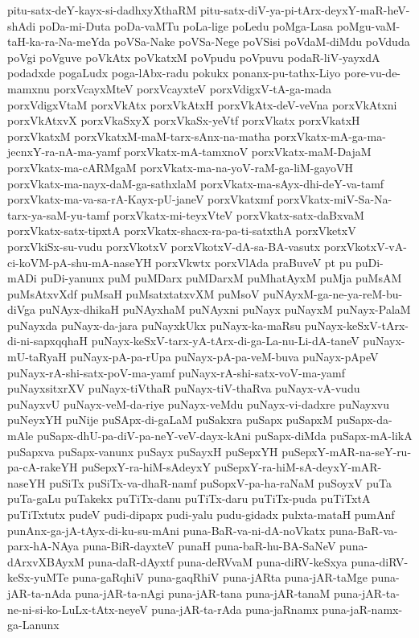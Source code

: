 {pitu-satx-deY-kayx-si-dadhxyXthaRM
pitu-satx-diV-ya-pi-tArx-deyxY-maR-heV-shAdi
poDa-mi-Duta
poDa-vaMTu
poLa-lige
poLedu
poMga-Lasa
poMgu-vaM-taH-ka-ra-Na-meYda
poVSa-Nake
poVSa-Nege
poVSisi
poVdaM-diMdu
poVduda
poVgi
poVguve
poVkAtx
poVkatxM
poVpudu
poVpuvu
podaR-liV-yayxdA
podadxde
pogaLudx
poga-lAbx-radu
pokukx
ponanx-pu-tathx-Liyo
pore-vu-de-mamxnu
porxVcayxMteV
porxVcayxteV
porxVdigxV-tA-ga-mada
porxVdigxVtaM
porxVkAtx
porxVkAtxH
porxVkAtx-deV-veVna
porxVkAtxni
porxVkAtxvX
porxVkaSxyX
porxVkaSx-yeVtf
porxVkatx
porxVkatxH
porxVkatxM
porxVkatxM-maM-tarx-sAnx-na-matha
porxVkatx-mA-ga-ma-jecnxY-ra-nA-ma-yamf
porxVkatx-mA-tamxnoV
porxVkatx-maM-DajaM
porxVkatx-ma-cARMgaM
porxVkatx-ma-na-yoV-raM-ga-liM-gayoVH
porxVkatx-ma-nayx-daM-ga-sathxlaM
porxVkatx-ma-sAyx-dhi-deY-va-tamf
porxVkatx-ma-va-sa-rA-Kayx-pU-janeV
porxVkatxmf
porxVkatx-miV-Sa-Na-tarx-ya-saM-yu-tamf
porxVkatx-mi-teyxVteV
porxVkatx-satx-daBxvaM
porxVkatx-satx-tipxtA
porxVkatx-shacx-ra-pa-ti-satxthA
porxVketxV
porxVkiSx-su-vudu
porxVkotxV
porxVkotxV-dA-sa-BA-vasutx
porxVkotxV-vA-ci-koVM-pA-shu-mA-naseYH
porxVkwtx
porxVlAda
praBuveV
pt
pu
puDi-mADi
puDi-yanunx
puM
puMDarx
puMDarxM
puMhatAyxM
puMja
puMsAM
puMsAtxvXdf
puMsaH
puMsatxtatxvXM
puMsoV
puNAyxM-ga-ne-ya-reM-bu-diVga
puNAyx-dhikaH
puNAyxhaM
puNAyxni
puNayx
puNayxM
puNayx-PalaM
puNayxda
puNayx-da-jara
puNayxkUkx
puNayx-ka-maRsu
puNayx-keSxV-tArx-di-ni-sapxqqhaH
puNayx-keSxV-tarx-yA-tArx-di-ga-La-nu-Li-dA-taneV
puNayx-mU-taRyaH
puNayx-pA-pa-rUpa
puNayx-pA-pa-veM-buva
puNayx-pApeV
puNayx-rA-shi-satx-poV-ma-yamf
puNayx-rA-shi-satx-voV-ma-yamf
puNayxsitxrXV
puNayx-tiVthaR
puNayx-tiV-thaRva
puNayx-vA-vudu
puNayxvU
puNayx-veM-da-riye
puNayx-veMdu
puNayx-vi-dadxre
puNayxvu
puNeyxYH
puNije
puSApx-di-gaLaM
puSakxra
puSapx
puSapxM
puSapx-da-mAle
puSapx-dhU-pa-diV-pa-neY-veV-dayx-kAni
puSapx-diMda
puSapx-mA-likA
puSapxva
puSapx-vanunx
puSayx
puSayxH
puSepxYH
puSepxY-mAR-na-seY-ru-pa-cA-rakeYH
puSepxY-ra-hiM-sAdeyxY
puSepxY-ra-hiM-sA-deyxY-mAR-naseYH
puSiTx
puSiTx-va-dhaR-namf
puSopxV-pa-ha-raNaM
puSoyxV
puTa
puTa-gaLu
puTakekx
puTiTx-danu
puTiTx-daru
puTiTx-puda
puTiTxtA
puTiTxtutx
pudeV
pudi-dipapx
pudi-yalu
pudu-gidadx
pulxta-mataH
pumAnf
punAnx-ga-jA-tAyx-di-ku-su-mAni
puna-BaR-va-ni-dA-noVkatx
puna-BaR-va-parx-hA-NAya
puna-BiR-dayxteV
punaH
puna-baR-hu-BA-SaNeV
puna-dArxvXBAyxM
puna-daR-dAyxtf
puna-deRVvaM
puna-diRV-keSxya
puna-diRV-keSx-yuMTe
puna-gaRqhiV
puna-gaqRhiV
puna-jARta
puna-jAR-taMge
puna-jAR-ta-nAda
puna-jAR-ta-nAgi
puna-jAR-tana
puna-jAR-tanaM
puna-jAR-ta-ne-ni-si-ko-LuLx-tAtx-neyeV
puna-jAR-ta-rAda
puna-jaRnamx
puna-jaR-namx-ga-Lanunx
}
